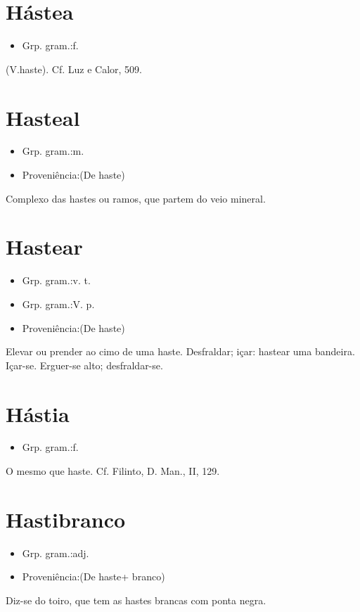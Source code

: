 \documentclass{article}
\begin{document}
\section{Hástea}
\begin{itemize}
\item {Grp. gram.:f.}
\end{itemize}
(V.haste). Cf. \textunderscore Luz e Calor\textunderscore , 509.
\section{Hasteal}
\begin{itemize}
\item {Grp. gram.:m.}
\end{itemize}
\begin{itemize}
\item {Proveniência:(De \textunderscore haste\textunderscore )}
\end{itemize}
Complexo das hastes ou ramos, que partem do veio mineral.
\section{Hastear}
\begin{itemize}
\item {Grp. gram.:v. t.}
\end{itemize}
\begin{itemize}
\item {Grp. gram.:V. p.}
\end{itemize}
\begin{itemize}
\item {Proveniência:(De \textunderscore haste\textunderscore )}
\end{itemize}
Elevar ou prender ao cimo de uma haste.
Desfraldar; içar: \textunderscore hastear uma bandeira\textunderscore .
Içar-se.
Erguer-se alto; desfraldar-se.
\section{Hástia}
\begin{itemize}
\item {Grp. gram.:f.}
\end{itemize}
O mesmo que \textunderscore haste\textunderscore . Cf. Filinto, \textunderscore D. Man.\textunderscore , II, 129.
\section{Hastibranco}
\begin{itemize}
\item {Grp. gram.:adj.}
\end{itemize}
\begin{itemize}
\item {Proveniência:(De \textunderscore haste\textunderscore  + \textunderscore branco\textunderscore )}
\end{itemize}
Diz-se do toiro, que tem as hastes brancas com ponta negra.
\end{document}
